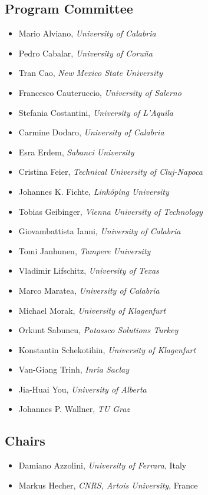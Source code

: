 \documentclass[
]{ceurart}
\begin{document}
\subsection*{Program Committee}
\begin{itemize}
  \item Mario Alviano, \emph{University of Calabria}
  \item Pedro Cabalar, \emph{University of Coru\~na}
  \item Tran Cao, \emph{New Mexico State University}
  \item Francesco Cauteruccio, \emph{University of Salerno}
  \item Stefania Costantini, \emph{University of L'Aquila}
  \item Carmine Dodaro, \emph{University of Calabria}
  \item Esra Erdem, \emph{Sabanci University}
  \item Cristina Feier, \emph{Technical University of Cluj-Napoca}
  \item Johannes K. Fichte, \emph{Linköping University}
  \item Tobias Geibinger, \emph{Vienna University of Technology}
  \item Giovambattista Ianni, \emph{University of Calabria}
  \item Tomi Janhunen, \emph{Tampere University}
  \item Vladimir Lifschitz, \emph{University of Texas}
  \item Marco Maratea, \emph{University of Calabria}
  \item Michael Morak, \emph{University of Klagenfurt}
  \item Orkunt Sabuncu, \emph{Potassco Solutions Turkey}
  \item Konstantin Schekotihin, \emph{University of Klagenfurt}
  \item Van-Giang Trinh, \emph{Inria Saclay}
  \item Jia-Huai You, \emph{University of Alberta}
  \item Johannes P. Wallner, \emph{TU Graz}
\end{itemize}


\subsection*{Chairs}
\begin{itemize}
  \item Damiano Azzolini, \emph{University of Ferrara}, Italy
  \item Markus Hecher, \emph{CNRS, Artois University}, France
\end{itemize}
\end{document}
